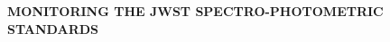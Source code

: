 \documentclass[letterpaper,12pt]{article}
\newcommand{\tess}{{\it TESS}}
\begin{document}
\pagestyle{plain}


 

\begin{center} 
\bfseries\uppercase{%
MONITORING THE JWST SPECTRO-PHOTOMETRIC STANDARDS
}
\end{center}







\end{document}
